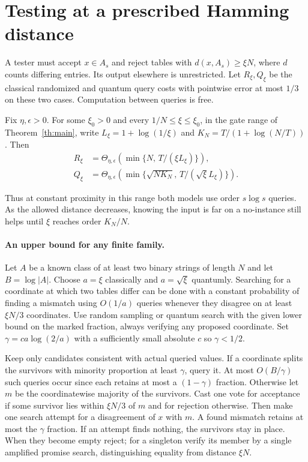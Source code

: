 \section{Testing at a prescribed Hamming distance}\label{sec:test}
A tester must accept $x\in A_s$ and reject tables with $d(x,A_s)\ge\xi N$, where $d$ counts differing entries. Its output elsewhere is unrestricted. Let $R_\xi,Q_\xi$ be the classical randomized and quantum query costs with pointwise error at most $1/3$ on these two cases. Computation between queries is free.
\begin{theorem}\label{th:testing}
Fix $\eta,\epsilon>0$. For some $\xi_0>0$ and every $1/N\le\xi\le\xi_0$, in the gate range of Theorem~\ref{th:main}, write $L_\xi=1+\log(1/\xi)$ and $K_N=T/(1+\log(N/T))$. Then
\begin{align*}
 R_\xi &=\Theta_{\eta,\epsilon}\!\left(\min\{N,\, T/(\xi L_\xi)\}\right),\\
 Q_\xi &=\Theta_{\eta,\epsilon}\!\left(\min\{\sqrt{NK_N},\,T/(\sqrt\xi L_\xi)\}\right).
\end{align*}
\end{theorem}
Thus at constant proximity in this range both models use order $s\log s$ queries. As the allowed distance decreases, knowing the input is far on a no-instance still helps until $\xi$ reaches order $K_N/N$.

\paragraph{An upper bound for any finite family.}
Let $A$ be a known class of at least two binary strings of length $N$ and let $B=\log |A|$. Choose $a=\xi$ classically and $a=\sqrt\xi$ quantumly. Searching for a coordinate at which two tables differ can be done with a constant probability of finding a mismatch using $O(1/a)$ queries whenever they disagree on at least $\xi N/3$ coordinates. Use random sampling or quantum search with the given lower bound on the marked fraction, always verifying any proposed coordinate. Set $\gamma=c a\log(2/a)$ with a sufficiently small absolute $c$ so $\gamma<1/2$.

Keep only candidates consistent with actual queried values. If a coordinate splits the survivors with minority proportion at least $\gamma$, query it. At most $O(B/\gamma)$ such queries occur since each retains at most a $(1-\gamma)$ fraction. Otherwise let $m$ be the coordinatewise majority of the survivors. Cast one vote for acceptance if some survivor lies within $\xi N/3$ of $m$ and for rejection otherwise. Then make one search attempt for a disagreement of $x$ with $m$. A found mismatch retains at most the $\gamma$ fraction. If an attempt finds nothing, the survivors stay in place. When they become empty reject; for a singleton verify its member by a single amplified promise search, distinguishing equality from distance $\xi N$.

